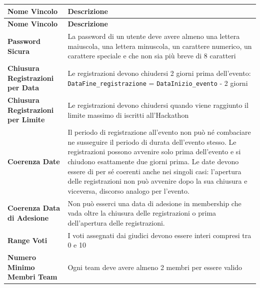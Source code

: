 \documentclass[a4paper, 10pt]{article}
\renewcommand{\arraystretch}{1.2} %
\begin{document}
	{\footnotesize
		\setlength{\arrayrulewidth}{0.5pt}
		\renewcommand{\arraystretch}{2.5}
		\begin{longtable}{
				>{\raggedright\arraybackslash}p{5.5cm}
				>{\raggedright\arraybackslash}p{10cm}
			}
			\hline
			\textbf{Nome Vincolo} & \textbf{Descrizione} \\
			\hline
			\endfirsthead
			\hline
			\textbf{Nome Vincolo} & \textbf{Descrizione} \\
			\hline
			\endhead
			\hline
			\endfoot
			\hline
			\endlastfoot
			
			\textbf{Password Sicura} &
			La password di un utente deve avere almeno una lettera maiuscola, una lettera minuscola, un carattere numerico, un carattere speciale e che non sia più breve di 8 caratteri \\
			\hline
			
			\textbf{Chiusura Registrazioni per Data} &
			Le registrazioni devono chiudersi 2 giorni prima dell'evento:
			\texttt{DataFine\_registrazione} = \texttt{DataInizio\_evento} - 2 giorni \\
			\hline
			
			\textbf{Chiusura Registrazioni per Limite} &
			Le registrazioni devono chiudersi quando viene raggiunto il limite massimo di iscritti all'Hackathon \\
			\hline
			
			\textbf{Coerenza Date} &
			Il periodo di registrazione all'evento non può né combaciare ne susseguire il periodo di durata dell'evento stesso.
			Le registrazioni possono avvenire solo prima dell'evento e si chiudono esattamente due giorni prima.
			Le date devono essere di per sé coerenti anche nei singoli casi: l'apertura delle registrazioni non può avvenire dopo
			la sua chiusura e viceversa, discorso analogo per l'evento.\\
			\hline
			
			\textbf{Coerenza Data di Adesione} &
			Non può esserci una data di adesione in membership che vada oltre la chiusura delle registrazioni o prima dell'apertura delle registrazioni.\\
			\hline
			
			\textbf{Range Voti} &
			I voti assegnati dai giudici devono essere interi compresi tra 0 e 10\\
			\hline
			
			\textbf{Numero Minimo Membri Team} &
			Ogni team deve avere almeno 2 membri per essere valido \\
			\hline
			

\end{longtable}}
\end{document}
